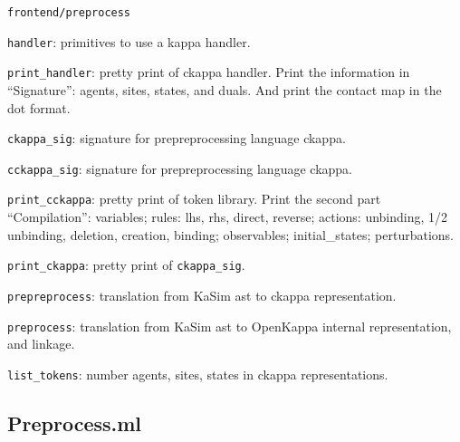 \documentclass{article}
\begin{document}
\begin{e}
\item \verb|frontend/preprocess|
\begin{i}
\item \verb|handler|: primitives to use a kappa handler.
\item \verb|print_handler|: pretty print of ckappa handler. Print the
  information in ``Signature'': agents, sites, states, and duals. And print
  the contact map in the dot format.
\item \verb|ckappa_sig|: signature for prepreprocessing language ckappa.
\item \verb|cckappa_sig|: signature for prepreprocessing language ckappa.
\item \verb|print_cckappa|: pretty print of token library. Print the second
  part ``Compilation'': variables; rules: lhs, rhs, direct, reverse;
  actions: unbinding, 1/2 unbinding, deletion, creation, binding;
  observables; initial\_states; perturbations.
\item \verb|print_ckappa|: pretty print of \verb|ckappa_sig|.

\item \verb|prepreprocess|: translation from KaSim ast to ckappa
  representation.
\item \verb|preprocess|: translation from KaSim ast to OpenKappa internal
  representation, and linkage.
\item \verb|list_tokens|: number agents, sites, states in ckappa
  representations.
\end{i}

\end{e}

\subsection{Preprocess.ml}
\end{document}
